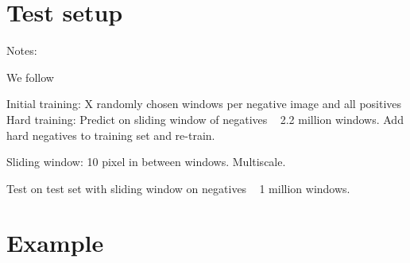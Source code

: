 \documentclass[thesis.tex]{subfiles}
\begin{document}
\section{Test setup}
Notes:

We follow \citet{dalal2005histograms}

Initial training: X randomly chosen windows per negative image and all positives
Hard training: Predict on sliding window of negatives ~ 2.2 million windows. Add hard negatives to training set and re-train.

Sliding window: 10 pixel in between windows. Multiscale.

Test on test set with sliding window on negatives ~ 1 million windows.

\section{Example}
\end{document}
